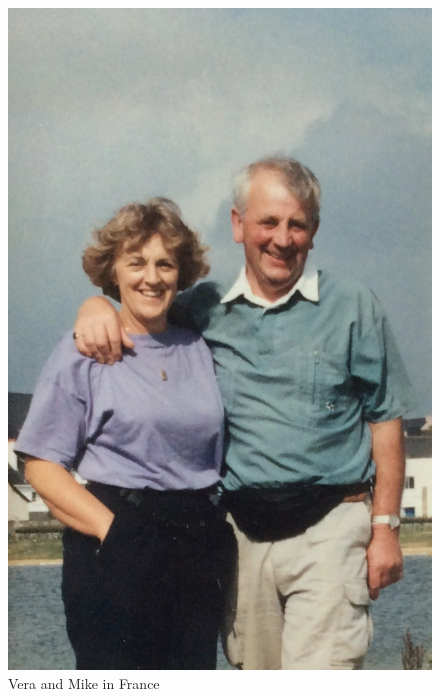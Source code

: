 \begin{figure}
  \centering
  \includegraphics[width=.9\linewidth]{pictures/cropped/Vera and Mike in France.jpg}
  \caption*{Vera and Mike in France}
\end{figure}
